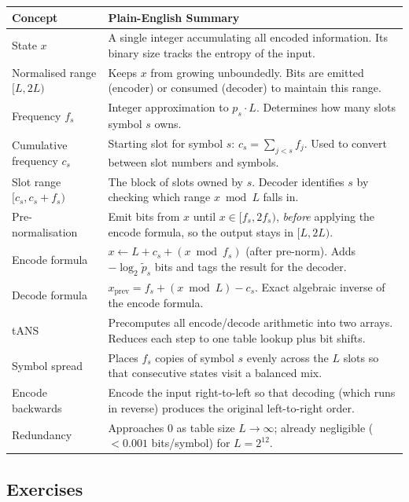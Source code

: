 \begin{center}
\begin{tabular}{@{}p{4.5cm}p{9.5cm}@{}}
\toprule
\textbf{Concept} & \textbf{Plain-English Summary} \\
\midrule
State $x$ &
  A single integer accumulating all encoded information.
  Its binary size tracks the entropy of the input. \\
Normalised range $[L, 2L)$ &
  Keeps $x$ from growing unboundedly.  Bits are emitted
  (encoder) or consumed (decoder) to maintain this range. \\
Frequency $f_s$ &
  Integer approximation to $p_s \cdot L$.
  Determines how many slots symbol $s$ owns. \\
Cumulative frequency $c_s$ &
  Starting slot for symbol $s$: $c_s = \sum_{j<s} f_j$.
  Used to convert between slot numbers and symbols. \\
Slot range $[c_s, c_s+f_s)$ &
  The block of slots owned by $s$.
  Decoder identifies $s$ by checking which range $x \bmod L$ falls in. \\
Pre-normalisation &
  Emit bits from $x$ until $x \in [f_s, 2f_s)$, \emph{before}
  applying the encode formula, so the output stays in $[L,2L)$. \\
Encode formula &
  $x \leftarrow L + c_s + (x \bmod f_s)$ (after pre-norm).
  Adds $-\log_2 \tilde{p}_s$ bits and tags the result for the decoder. \\
Decode formula &
  $x_{\text{prev}} = f_s + (x \bmod L) - c_s$.
  Exact algebraic inverse of the encode formula. \\
tANS &
  Precomputes all encode/decode arithmetic into two arrays.
  Reduces each step to one table lookup plus bit shifts. \\
Symbol spread &
  Places $f_s$ copies of symbol $s$ evenly across the $L$
  slots so that consecutive states visit a balanced mix. \\
Encode backwards &
  Encode the input right-to-left so that decoding
  (which runs in reverse) produces the original left-to-right order. \\
Redundancy &
  Approaches 0 as table size $L \to \infty$;
  already negligible ($<0.001$ bits/symbol) for $L = 2^{12}$. \\
\bottomrule
\end{tabular}
\end{center}

\subsection{Exercises}

